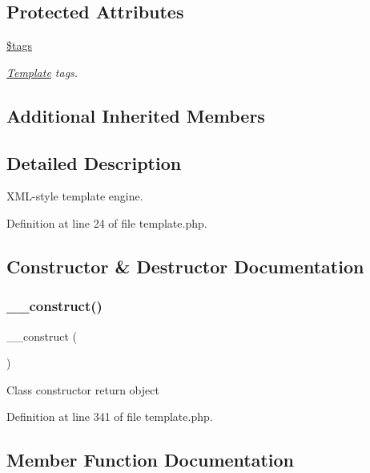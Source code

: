 \subsection*{Protected Attributes}
\begin{DoxyCompactItemize}
\item 
\hypertarget{class_template_a475a6a63b85186663d34151bcbd21590}{}\label{class_template_a475a6a63b85186663d34151bcbd21590} 
\hyperlink{class_template_a475a6a63b85186663d34151bcbd21590}{\$tags}
\begin{DoxyCompactList}\small\item\em \hyperlink{class_template}{Template} tags. \end{DoxyCompactList}\end{DoxyCompactItemize}
\subsection*{Additional Inherited Members}


\subsection{Detailed Description}
X\+M\+L-\/style template engine. 

Definition at line 24 of file template.\+php.



\subsection{Constructor \& Destructor Documentation}
\hypertarget{class_template_a095c5d389db211932136b53f25f39685}{}\label{class_template_a095c5d389db211932136b53f25f39685} 
\subsubsection{\texorpdfstring{\+\_\+\+\_\+construct()}{\_\_construct()}}
{\footnotesize\ttfamily \+\_\+\+\_\+construct (\begin{DoxyParamCaption}{ }\end{DoxyParamCaption})}

Class constructor return object 

Definition at line 341 of file template.\+php.



\subsection{Member Function Documentation}
\hypertarget{class_template_a975d2c46a134129eb727fadcadf48adf}{}\label{class_template_a975d2c46a134129eb727fadcadf48adf} 
